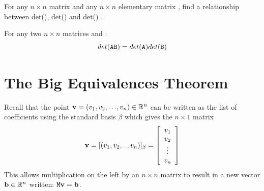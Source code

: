 \begin{myexc}[\bd{c}] 
	For any $n \times n$ matrix  and any $n \times n$ elementary matrix , find a relationship between det(), det() and det() .
\end{myexc}

\begin{theorem}
	For any two $n \times n$ matrices  and : \[det(\texttt{AB})= det(\texttt{A})det(\texttt{B})\]
\end{theorem}
\vspace{-.3in}\hspace{5in}\begin{annotation}
\end{annotation}

\vspace{.5cm}

\section{The Big Equivalences Theorem}    \label{The Big Equivalences Theorem}

Recall that the point $\mathbf{v} = ({v_1},{v_2},{\ldots},{v_n}) \in \mathbb{R}^n$ can be written as the list of coefficients using the standard basis $\beta$ which gives the $n \times 1$ matrix \[ \mathbf{v} =[(v_1,v_2, ..,v_n)]_{\beta} = \left[ \begin{array}{c} v_1\\v_2\\ \vdots \\v_n \end{array}\right] \]This allows multiplication on the left by an $n \times n$ matrix  to result in a new vector $\mathbf{b} \in \mathbb{R}^n$ written: $\texttt{M}\mathbf{v} = \mathbf{b}$.

